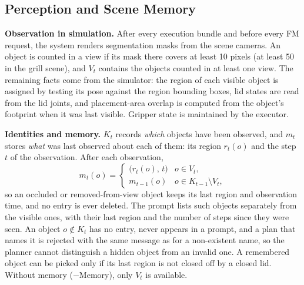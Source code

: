 \subsection{Perception and Scene Memory}
\label{sec:supp-perception}
\noindent\textbf{Observation in simulation.} After every execution bundle and before every FM request, the
system renders segmentation masks from the scene cameras. An object is counted in a view if its mask there
covers at least 10 pixels (at least 50 in the grill scene), and $V_t$ contains the objects counted in at least
one view. The remaining facts come from the simulator: the region of each visible object is assigned by testing
its pose against the region bounding boxes, lid states are read from the lid joints, and placement-area overlap
is computed from the object's footprint when it was last visible. Gripper state is maintained by the executor.

\noindent\textbf{Identities and memory.} $K_t$ records \emph{which} objects have been observed, and $m_t$ stores
\emph{what} was last observed about each of them: its region $r_t(o)$ and the step $t$ of the observation.
After each observation,
\begin{equation}
m_t(o)=\begin{cases}
\big(r_t(o),\,t\big) & o\in V_t,\\
m_{t-1}(o) & o\in K_{t-1}\setminus V_t,
\end{cases}
\label{eq:supp-memory}
\end{equation}
so an occluded or removed-from-view object keeps its last region and observation time, and no entry is ever
deleted. The prompt lists such objects separately from the visible ones, with their last region and the number
of steps since they were seen. An object $o\notin K_t$ has no entry, never appears in a prompt, and a plan that
names it is rejected with the same message as for a non-existent name, so the planner cannot distinguish a
hidden object from an invalid one. A remembered object can be picked only if its last region is not closed off
by a closed lid. Without memory ($-$Memory), only $V_t$ is available.

